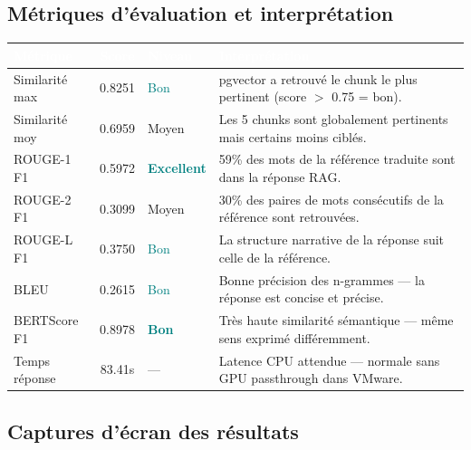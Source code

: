 \documentclass[12pt,a4paper]{report}
\begin{document}
\subsection{Métriques d'évaluation et interprétation}

\vspace{6pt}
\begin{center}
\small
\begin{tabular}{|l|c|l|p{5.5cm}|}
  \hline
  \rowcolor{mainblue}
  \textcolor{white}{\textbf{Métrique}} &
  \textcolor{white}{\textbf{Score}} &
  \textcolor{white}{\textbf{Niveau}} &
  \textcolor{white}{\textbf{Interprétation}} \\
  \hline
  Similarité max & 0.8251 & \textcolor{teal}{Bon} &
    pgvector a retrouvé le chunk le plus pertinent (score $>$ 0.75 = bon). \\
  \rowcolor{lightblue}
  Similarité moy & 0.6959 & Moyen &
    Les 5 chunks sont globalement pertinents mais certains moins ciblés. \\
  ROUGE-1 F1 & 0.5972 & \textcolor{teal}{\textbf{Excellent}} &
    59\% des mots de la référence traduite sont dans la réponse RAG. \\
  \rowcolor{lightblue}
  ROUGE-2 F1 & 0.3099 & Moyen &
    30\% des paires de mots consécutifs de la référence sont retrouvées. \\
  ROUGE-L F1 & 0.3750 & \textcolor{teal}{Bon} &
    La structure narrative de la réponse suit celle de la référence. \\
  \rowcolor{lightblue}
  BLEU & 0.2615 & \textcolor{teal}{Bon} &
    Bonne précision des n-grammes — la réponse est concise et précise. \\
  BERTScore F1 & 0.8978 & \textcolor{teal}{\textbf{Bon}} &
    Très haute similarité sémantique — même sens exprimé différemment. \\
  \hline
  Temps réponse & 83.41s & — &
    Latence CPU attendue — normale sans GPU passthrough dans VMware. \\
  \hline
\end{tabular}
\end{center}

\subsection{Captures d'écran des résultats}
\end{document}
